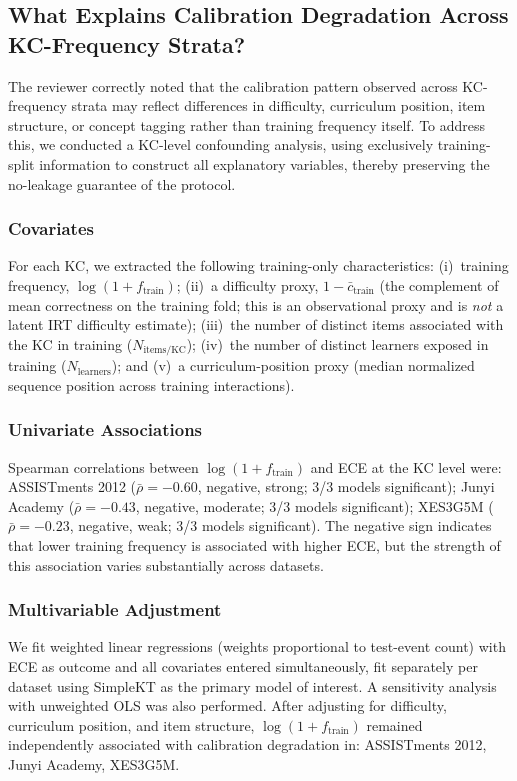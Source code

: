 \subsection{What Explains Calibration Degradation Across KC-Frequency Strata?}
\label{sec:a4_confounding}

The reviewer correctly noted that the calibration pattern observed across KC-frequency strata may reflect differences in difficulty, curriculum position, item structure, or concept tagging rather than training frequency itself.
To address this, we conducted a KC-level confounding analysis, using exclusively training-split information to construct all explanatory variables, thereby preserving the no-leakage guarantee of the protocol.

\subsubsection*{Covariates}
For each KC, we extracted the following training-only characteristics: (i)~training frequency, $\log(1 + f_{\text{train}})$; (ii)~a difficulty proxy, $1 - \bar{c}_{\text{train}}$ (the complement of mean correctness on the training fold; this is an observational proxy and is \emph{not} a latent IRT difficulty estimate); (iii)~the number of distinct items associated with the KC in training ($N_{\text{items/KC}}$); (iv)~the number of distinct learners exposed in training ($N_{\text{learners}}$); and (v)~a curriculum-position proxy (median normalized sequence position across training interactions).

\subsubsection*{Univariate Associations}
Spearman correlations between $\log(1 + f_{\text{train}})$ and ECE at the KC level were: ASSISTments 2012 ($\bar{\rho} = -0.60$, negative, strong; 3/3 models significant); Junyi Academy ($\bar{\rho} = -0.43$, negative, moderate; 3/3 models significant); XES3G5M ($\bar{\rho} = -0.23$, negative, weak; 3/3 models significant). The negative sign indicates that lower training frequency is associated with higher ECE, but the strength of this association varies substantially across datasets.

\subsubsection*{Multivariable Adjustment}
We fit weighted linear regressions (weights proportional to test-event count) with ECE as outcome and all covariates entered simultaneously, fit separately per dataset using SimpleKT as the primary model of interest. A sensitivity analysis with unweighted OLS was also performed.
After adjusting for difficulty, curriculum position, and item structure, $\log(1 + f_{\text{train}})$ remained independently associated with calibration degradation in: ASSISTments 2012, Junyi Academy, XES3G5M. 

